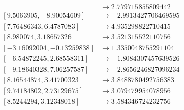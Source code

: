 \documentclass[12pt]{article}
\begin{document}
\begin{align*}
	[8.79546278, 2.06447912] &\rightarrow 2.779715855809442\\
	[ 9.5063905,  -8.90054609] &\rightarrow -2.9913427706469595\\
	[7.76486343, 6.4787083 ] &\rightarrow4.935298822710415\\
	[8.980074,   3.18657326] &\rightarrow 3.521315522110756\\
	[-3.16092004, -0.13259838] &\rightarrow 1.3350048755291104\\
	[-6.54872245,  2.68558311] &\rightarrow -1.8084307457639526\\
	[-9.18640328,  7.06257587] &\rightarrow -2.8656246827096234\\
	[8.16544874, 3.41700323] &\rightarrow 3.8488780492756383\\
	[9.74184802, 2.73129675] &\rightarrow 3.079479954078956\\
	[8.5244294,  3.12348018] &\rightarrow 3.584346724232756
\end{align*}
\newpage
\end{document}
